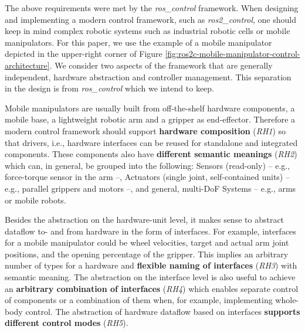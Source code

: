 \documentclass[journal]{IEEEtran}
\begin{document}
The above requirements were met by the \emph{ros\_control} framework.
When designing and implementing a modern control framework, such as \emph{ros2\_control}, one should keep in mind complex robotic systems such as industrial robotic cells or mobile manipulators.
For this paper, we use the example of a mobile manipulator depicted in the upper-right corner of Figure \ref{fig:ros2c-mobile-manipulator-control-architecture}.
We consider two aspects of the framework that are generally independent, hardware abstraction and controller management.
This separation in the design is from \emph{ros\_control} \cite{ref_roscontrol} which we intend to keep.


Mobile manipulators are usually built from off-the-shelf hardware components, a mobile base, a lightweight robotic arm and a gripper as end-effector. Therefore a modern control framework should support \textbf{hardware composition} (\emph{RH1}) so that drivers, i.e., hardware interfaces can be reused for standalone and integrated components. These components also have \textbf{different semantic meanings} (\emph{RH2}) which can, in general, be grouped into the following: Sensors (read-only) -- e.g., force-torque sensor in the arm --, Actuators (single joint, self-contained units) -- e.g., parallel grippers and motors --, and general, multi-DoF Systems -- e.g., arms or mobile robots.

Besides the abstraction on the hardware-unit level, it makes sense to abstract dataflow to- and from hardware in the form of interfaces.
For example, interfaces for a mobile manipulator could be wheel velocities, target and actual arm joint positions, and the opening percentage of the gripper.
This implies an arbitrary number of types for a hardware and \textbf{flexible naming of interfaces} (\emph{RH3}) with semantic meaning.
The abstraction on the interface level is also useful to achieve an \textbf{arbitrary combination of interfaces} (\emph{RH4}) which enables separate control of components or a combination of them when, for example, implementing whole-body control.
The abstraction of hardware dataflow based on interfaces \textbf{supports different control modes} (\emph{RH5}).
\end{document}
